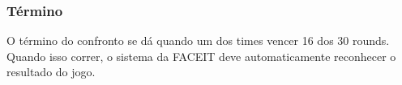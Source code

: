 \subsubsection{Término}

O término do confronto se dá quando um dos times vencer 16 dos 30 rounds. Quando isso correr, o sistema da FACEIT deve automaticamente reconhecer o resultado do jogo.